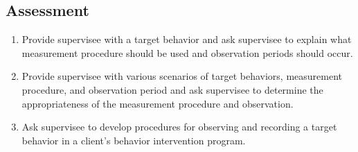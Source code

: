 \subsection{Assessment}
\begin{enumerate}
\item Provide supervisee with a target behavior and ask supervisee to explain what measurement procedure should be used and observation periods should occur.
\item Provide supervisee with various scenarios of target behaviors, measurement procedure, and observation period and ask supervisee to determine the appropriateness of the measurement procedure and observation.
\item Ask supervisee to develop procedures for observing and recording a target behavior in a client's behavior intervention program.
%
\end{enumerate}
%
